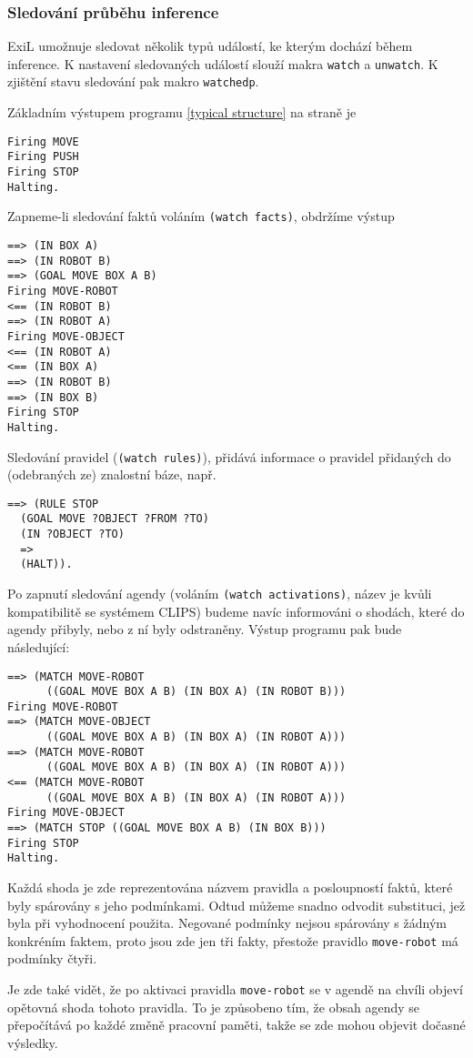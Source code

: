 \subsubsection{Sledování průběhu inference}
ExiL umožnuje sledovat několik typů událostí, ke kterým dochází během inference.
K nastavení sledovaných událostí slouží makra \verb|watch| a \verb|unwatch|. K
zjištění stavu sledování pak makro \verb|watchedp|.

Základním výstupem programu \ref{typical structure} na straně \pageref{typical
structure} je
\begin{verbatim}
Firing MOVE
Firing PUSH
Firing STOP
Halting.
\end{verbatim}
Zapneme-li sledování faktů voláním \verb|(watch facts)|, obdržíme výstup
\begin{verbatim}
==> (IN BOX A)
==> (IN ROBOT B)
==> (GOAL MOVE BOX A B)
Firing MOVE-ROBOT
<== (IN ROBOT B)
==> (IN ROBOT A)
Firing MOVE-OBJECT
<== (IN ROBOT A)
<== (IN BOX A)
==> (IN ROBOT B)
==> (IN BOX B)
Firing STOP
Halting.
\end{verbatim}

Sledování pravidel (\verb|(watch rules)|), přidává informace o pravidel
přidaných do (odebraných ze) znalostní báze, např.
\begin{verbatim}
==> (RULE STOP
  (GOAL MOVE ?OBJECT ?FROM ?TO)
  (IN ?OBJECT ?TO)
  =>
  (HALT)).
\end{verbatim}

Po zapnutí sledování agendy (voláním \verb|(watch activations)|, název je kvůli
kompatibilitě se systémem CLIPS) budeme navíc informováni o shodách, které do
agendy přibyly, nebo z ní byly odstraněny. Výstup programu pak bude následující:
\begin{verbatim}
==> (MATCH MOVE-ROBOT
      ((GOAL MOVE BOX A B) (IN BOX A) (IN ROBOT B)))
Firing MOVE-ROBOT
==> (MATCH MOVE-OBJECT
      ((GOAL MOVE BOX A B) (IN BOX A) (IN ROBOT A)))
==> (MATCH MOVE-ROBOT
      ((GOAL MOVE BOX A B) (IN BOX A) (IN ROBOT A)))
<== (MATCH MOVE-ROBOT
      ((GOAL MOVE BOX A B) (IN BOX A) (IN ROBOT A)))
Firing MOVE-OBJECT
==> (MATCH STOP ((GOAL MOVE BOX A B) (IN BOX B)))
Firing STOP
Halting.
\end{verbatim}
Každá shoda je zde reprezentována názvem pravidla a posloupností faktů, které
byly spárovány s jeho podmínkami. Odtud můžeme snadno odvodit substituci, jež
byla při vyhodnocení použita. Negované podmínky nejsou spárovány s žádným
konkréním faktem, proto jsou zde jen tři fakty, přestože pravidlo
\verb|move-robot| má podmínky čtyři.

Je zde také vidět, že po aktivaci pravidla
\verb|move-robot| se v agendě na chvíli objeví opětovná shoda tohoto pravidla.
To je způsobeno tím, že obsah agendy se přepočítává po každé změně pracovní
paměti, takže se zde mohou objevit dočasné výsledky.
